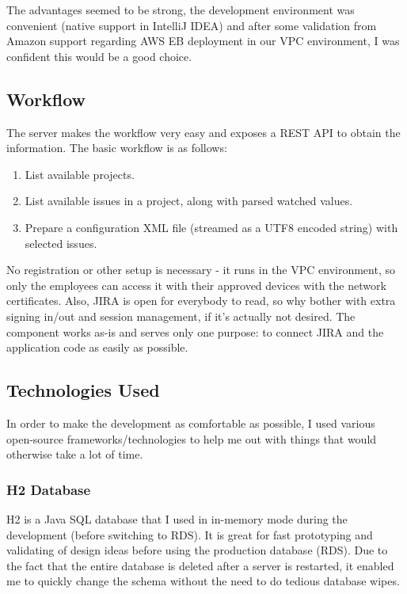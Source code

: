 The advantages seemed to be strong, the development environment was convenient (native support in IntelliJ IDEA) and after some validation from Amazon support regarding AWS EB deployment in our VPC environment, I was confident this would be a good choice.

\subsection{Workflow}

The server makes the workflow very easy and exposes a REST API to obtain the information. The basic workflow is as follows:

\begin{enumerate}
	\item List available projects.
	\item List available issues in a project, along with parsed watched values.
	\item Prepare a configuration XML file (streamed as a UTF8 encoded string) with selected issues.
\end{enumerate}

No registration or other setup is necessary - it runs in the VPC environment, so only the employees can access it with their approved devices with the network certificates. Also, JIRA is open for everybody to read, so why bother with extra signing in/out and session management, if it's actually not desired. The component works as-is and serves only one purpose: to connect JIRA and the application code as easily as possible.

\newpage

\subsection{Technologies Used}

In order to make the development as comfortable as possible, I used various open-source frameworks/technologies to help me out with things that would otherwise take a lot of time.

\subsubsection{H2 Database}

H2 is a Java SQL database that I used in in-memory mode during the development (before switching to RDS). It is great for fast prototyping and validating of design ideas before using the production database (RDS). Due to the fact that the entire database is deleted after a server is restarted, it enabled me to quickly change the schema without the need to do tedious database wipes. 


